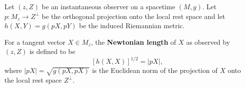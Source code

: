 Let $(z, Z)$ be an instantaneous observer on a spacetime $(M, g)$. Let $p: M_z \to Z^\perp$ be the orthogonal projection onto the local rest space and let $h(X, Y) = g(pX, pY)$ be the induced Riemannian metric.

For a tangent vector $X \in M_z$, the \textbf{Newtonian length} of $X$ as observed by $(z, Z)$ is defined to be
$$[h(X, X)]^{1/2} = |pX|,$$
where $|pX| = \sqrt{g(pX, pX)}$ is the Euclidean norm of the projection of $X$ onto the local rest space $Z^\perp$.
